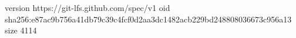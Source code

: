 version https://git-lfs.github.com/spec/v1
oid sha256:e87ac9b756a41db79c39c4fcf0d2aa3dc1482acb229bd248808036673c956a13
size 4114

